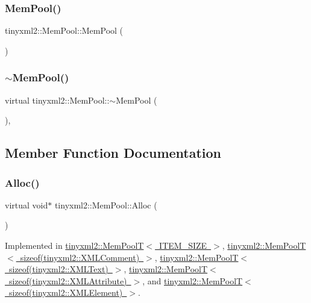 \subsubsection{\texorpdfstring{Mem\+Pool()}{MemPool()}}
{\footnotesize\ttfamily tinyxml2\+::\+Mem\+Pool\+::\+Mem\+Pool (\begin{DoxyParamCaption}{ }\end{DoxyParamCaption})\hspace{0.3cm}{\ttfamily [inline]}}

\mbox{\label{classtinyxml2_1_1_mem_pool_ae55ad9e3faeca702e6ccbb38fdbcad72}} 
\subsubsection{\texorpdfstring{$\sim$\+Mem\+Pool()}{~MemPool()}}
{\footnotesize\ttfamily virtual tinyxml2\+::\+Mem\+Pool\+::$\sim$\+Mem\+Pool (\begin{DoxyParamCaption}{ }\end{DoxyParamCaption})\hspace{0.3cm}{\ttfamily [inline]}, {\ttfamily [virtual]}}



\subsection{Member Function Documentation}
\mbox{\label{classtinyxml2_1_1_mem_pool_a4f977b5fed752c0bbfe5295f469d6449}} 
\subsubsection{\texorpdfstring{Alloc()}{Alloc()}}
{\footnotesize\ttfamily virtual void$\ast$ tinyxml2\+::\+Mem\+Pool\+::\+Alloc (\begin{DoxyParamCaption}{ }\end{DoxyParamCaption})\hspace{0.3cm}{\ttfamily [pure virtual]}}



Implemented in \mbox{\hyperlink{classtinyxml2_1_1_mem_pool_t_a810fd2b0caf56b8b688e55f2768f96c7}{tinyxml2\+::\+Mem\+Pool\+T$<$ I\+T\+E\+M\+\_\+\+S\+I\+Z\+E $>$}}, \mbox{\hyperlink{classtinyxml2_1_1_mem_pool_t_a810fd2b0caf56b8b688e55f2768f96c7}{tinyxml2\+::\+Mem\+Pool\+T$<$ sizeof(tinyxml2\+::\+X\+M\+L\+Comment) $>$}}, \mbox{\hyperlink{classtinyxml2_1_1_mem_pool_t_a810fd2b0caf56b8b688e55f2768f96c7}{tinyxml2\+::\+Mem\+Pool\+T$<$ sizeof(tinyxml2\+::\+X\+M\+L\+Text) $>$}}, \mbox{\hyperlink{classtinyxml2_1_1_mem_pool_t_a810fd2b0caf56b8b688e55f2768f96c7}{tinyxml2\+::\+Mem\+Pool\+T$<$ sizeof(tinyxml2\+::\+X\+M\+L\+Attribute) $>$}}, and \mbox{\hyperlink{classtinyxml2_1_1_mem_pool_t_a810fd2b0caf56b8b688e55f2768f96c7}{tinyxml2\+::\+Mem\+Pool\+T$<$ sizeof(tinyxml2\+::\+X\+M\+L\+Element) $>$}}.

